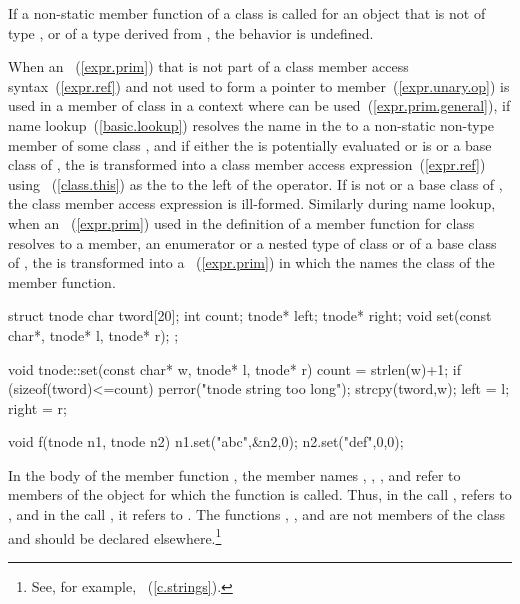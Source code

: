 \pnum
{}%
If a non-static member function of a class  is called for an
object that is not of type , or of a type derived from
, the behavior is undefined.

\pnum
When an ~(\ref{expr.prim}) that is not part of a
class member access syntax~(\ref{expr.ref}) and not used to form a
pointer to member~(\ref{expr.unary.op}) is used in
a member of class  in a context where  can be
used~(\ref{expr.prim.general}),
if name
lookup~(\ref{basic.lookup}) resolves the name in the
 to a non-static non-type member of some class
,
and if either the  is potentially evaluated or
 is  or a base class of ,
the  is transformed into a class
member access expression~(\ref{expr.ref}) using
~(\ref{class.this}) as the 
to the left of the  operator.
\enternote
If  is not  or a base class of , the class
member access expression is ill-formed.
\exitnote
Similarly during name lookup, when an
~(\ref{expr.prim}) used in the definition of a
member function for class  resolves to a  member,
an enumerator or a nested type of class  or of a base class of
, the  is transformed into a
~(\ref{expr.prim}) in which the
 names the class of the member function.
%
\enterexample

\begin{codeblock}
struct tnode {
  char tword[20];
  int count;
  tnode* left;
  tnode* right;
  void set(const char*, tnode* l, tnode* r);
};

void tnode::set(const char* w, tnode* l, tnode* r) {
  count = strlen(w)+1;
  if (sizeof(tword)<=count)
      perror("tnode string too long");
  strcpy(tword,w);
  left = l;
  right = r;
}

void f(tnode n1, tnode n2) {
  n1.set("abc",&n2,0);
  n2.set("def",0,0);
}
\end{codeblock}

In the body of the member function , the member names
, , , and  refer to
members of the object for which the function is called. Thus, in the
call ,  refers to
, and in the call , it refers
to . The functions , , and
 are not members of the class  and should be
declared elsewhere.\footnote{See, for example, ~(\ref{c.strings}).}
\exitexample

